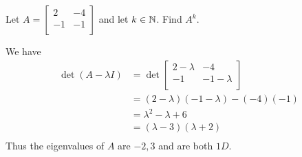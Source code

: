 \documentclass{article}
\begin{document}
\begin{example}
  Let $A =
    \begin{bmatrix}
      2  & -4 \\
      -1 & -1 \\
    \end{bmatrix}$ and let $k \in \mathbb{N}$. Find $A^k$.

  We have
  \begin{align*}
    \det (A - \lambda I) & = \det
    \begin{bmatrix}
      2 - \lambda & -4           \\
      -1          & -1 - \lambda \\
    \end{bmatrix}                                      \\
                         & = (2 - \lambda)(-1 - \lambda) - (-4)(-1) \\
                         & = \lambda^2 - \lambda + 6                \\
                         & = (\lambda - 3)(\lambda + 2)             \\
  \end{align*}
  Thus the eigenvalues of $A$ are $-2, 3$ and are both $1D$.


\end{example}
\end{document}
